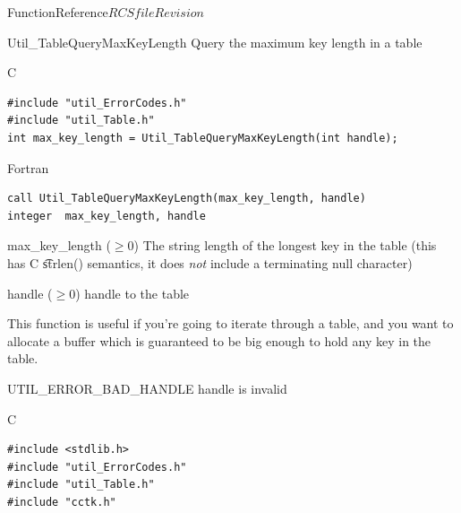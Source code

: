 \begin{cactuspart}{FunctionReference}{$RCSfile$}{$Revision$}

\begin{FunctionDescription}{Util\_TableQueryMaxKeyLength}
\label{Util-TableQueryMaxKeyLength}
Query the maximum key length in a table

\begin{SynopsisSection}
\begin{Synopsis}{C}
\begin{verbatim}
#include "util_ErrorCodes.h"
#include "util_Table.h"
int max_key_length = Util_TableQueryMaxKeyLength(int handle);
\end{verbatim}
\end{Synopsis}
\begin{Synopsis}{Fortran}
\begin{verbatim}
call Util_TableQueryMaxKeyLength(max_key_length, handle)
integer  max_key_length, handle
\end{verbatim}
\end{Synopsis}
\end{SynopsisSection}

\begin{ResultSection}
\begin{Result}{max\_key\_length ($\ge 0$)}
The string length of the longest key in the table
(this has C {\t strlen()} semantics, \ie{} it does {\em not\/}
include a terminating null character)
\end{Result}
\end{ResultSection}

\begin{ParameterSection}
\begin{Parameter}{handle ($\ge 0$)}
handle to the table
\end{Parameter}
\end{ParameterSection}

\begin{Discussion}
This function is useful if you're going to iterate through a table,
and you want to allocate a buffer which is guaranteed to be big enough
to hold any key in the table.
\end{Discussion}

\begin{ErrorSection}
\begin{Error}{UTIL\_ERROR\_BAD\_HANDLE}
handle is invalid
\end{Error}
\end{ErrorSection}

\begin{ExampleSection}
\begin{Example}{C}
\begin{verbatim}
#include <stdlib.h>
#include "util_ErrorCodes.h"
#include "util_Table.h"
#include "cctk.h"


\end{verbatim}
\end{Example}
\end{ExampleSection}
\end{FunctionDescription}
\end{cactuspart}
